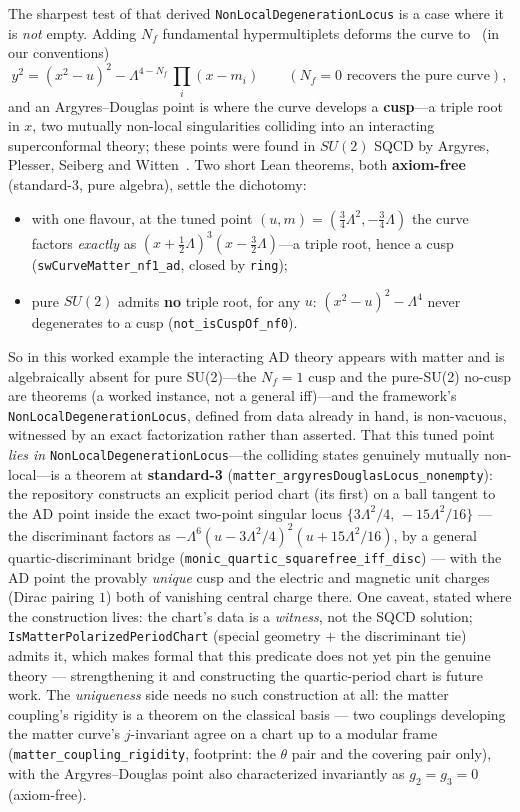 \documentclass{article}
\theoremstyle{plain}
\theoremstyle{definition}
\numberwithin{equation}{section}
\newcommand{\code}[1]{\texttt{#1}}
\begin{document}
The sharpest test of that derived \texttt{NonLocalDegenerationLocus} is a case where it is \emph{not}
empty. Adding $N_f$ fundamental hypermultiplets deforms the curve to~\cite{SeibergWitten1994b}
(in our conventions)
\[
  y^2 = (x^2 - u)^2 - \Lambda^{4-N_f}\,\textstyle\prod_i (x - m_i)
  \qquad (N_f = 0 \text{ recovers the pure curve}),
\]
and an Argyres--Douglas point is where the curve develops a \textbf{cusp}---a triple root in $x$, two
mutually non-local singularities colliding into an interacting superconformal theory; these points
were found in $SU(2)$ SQCD by Argyres, Plesser, Seiberg and Witten~\cite{APSW1996}. Two short Lean
theorems, both \textbf{axiom-free} (standard-3, pure algebra), settle the dichotomy:
\begin{itemize}
\item with one flavour, at the tuned point $(u,m) = (\tfrac34\Lambda^2, -\tfrac34\Lambda)$ the curve
  factors \emph{exactly} as $(x + \tfrac12\Lambda)^3 (x - \tfrac32\Lambda)$---a triple root, hence a
  cusp (\texttt{swCurveMatter\_nf1\_ad}, closed by \texttt{ring});
\item pure $SU(2)$ admits \textbf{no} triple root, for any $u$: $(x^2-u)^2 - \Lambda^4$ never
  degenerates to a cusp (\texttt{not\_\allowbreak isCuspOf\_nf0}).
\end{itemize}
So in this worked example the interacting AD theory appears with matter and is algebraically absent
for pure SU(2)---the $N_f{=}1$ cusp and the pure-SU(2) no-cusp are theorems (a worked instance, not a
general iff)---and the framework's \texttt{NonLocalDegenerationLocus}, defined from data already
in hand, is non-vacuous, witnessed by an exact factorization rather than asserted. That this
tuned point \emph{lies in} \texttt{NonLocalDegenerationLocus}---the colliding states genuinely
mutually non-local---is a theorem at \textbf{standard-3}
(\code{matter\_argyresDouglasLocus\_nonempty}): the repository constructs an explicit period
chart (its first) on a ball tangent to the AD point inside the exact two-point singular locus
$\{3\Lambda^2/4,\, -15\Lambda^2/16\}$ --- the discriminant factors as
$-\Lambda^6(u - 3\Lambda^2/4)^2(u + 15\Lambda^2/16)$, by a general quartic-discriminant
bridge (\code{monic\_quartic\_squarefree\_iff\_disc}) --- with the AD point the provably
\emph{unique} cusp and the electric and magnetic unit charges (Dirac pairing $1$) both of
vanishing central charge there. One caveat, stated where the construction lives: the chart's
data is a \emph{witness}, not the SQCD solution; \code{IsMatterPolarizedPeriodChart} (special
geometry $+$ the discriminant tie) admits it, which makes formal that this predicate does not
yet pin the genuine theory --- strengthening it and constructing the quartic-period chart is
future work. The \emph{uniqueness} side needs no such construction at all: the matter
coupling's rigidity is a theorem on the classical basis --- two couplings developing the matter
curve's $j$-invariant agree on a chart up to a modular frame
(\texttt{matter\_coupling\_rigidity}, footprint: the $\theta$ pair and the covering pair
only), with the Argyres--Douglas point also characterized invariantly as $g_2 = g_3 = 0$
(axiom-free).
\end{document}
